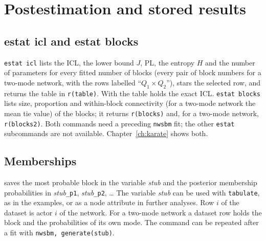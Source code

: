 \chapter{Postestimation and stored results}\label{ch:post}

\section{estat icl and estat blocks}
\texttt{estat icl} lists the ICL, the lower bound $J$, PL, the entropy $H$ and the number of parameters for every fitted number of blocks (every pair of block numbers for a two-mode network, with the rows labelled ``$Q_1\times Q_2$''), stars the selected row, and returns the table in \texttt{r(table)}. With  the table holds the exact ICL. \texttt{estat blocks} lists size, proportion and within-block connectivity (for a two-mode network the mean tie value) of the blocks; it returns \texttt{r(blocks)} and, for a two-mode network, \texttt{r(blocks2)}. Both commands need a preceding \texttt{nwsbm} fit; the other \texttt{estat} subcommands are not available. Chapter~\ref{ch:karate} shows both.

\section{Memberships}
 saves the most probable block in the variable \emph{stub} and the posterior membership probabilities in \emph{stub}\texttt{\_p1}, \emph{stub}\texttt{\_p2}, \dots{} The variable \emph{stub} can be used with \texttt{tabulate}, as in the examples, or as a node attribute in further analyses. Row $i$ of the dataset is actor $i$ of the network. For a two-mode network a dataset row holds the block and the probabilities of its own mode. The command can be repeated after a fit with \texttt{nwsbm, generate(stub)}.

